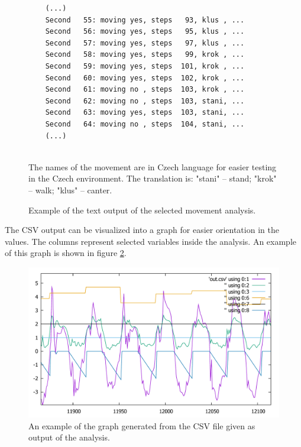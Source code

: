 \begin{figure}
    \centering
    \label{fig:textOutputAnalysis}
    \caption{Example of the text output of the selected movement analysis.}
    \begin{verbatim}
    (...)
    Second   55: moving yes, steps   93, klus , ...
    Second   56: moving yes, steps   95, klus , ...
    Second   57: moving yes, steps   97, klus , ...
    Second   58: moving yes, steps   99, krok , ...
    Second   59: moving yes, steps  101, krok , ...
    Second   60: moving yes, steps  102, krok , ...
    Second   61: moving no , steps  103, krok , ...
    Second   62: moving no , steps  103, stani, ...
    Second   63: moving yes, steps  103, stani, ...
    Second   64: moving no , steps  104, stani, ...
    (...)
    \end{verbatim}
    \quad\\The names of the movement are in Czech language for easier testing in the Czech environment. The translation is: "stani" -- stand; "krok" -- walk; "klus" -- canter.
\end{figure}

The \ac{CSV} output can be visualized into a graph for easier orientation in the values. The columns represent selected variables inside the analysis. An example of this graph is shown in figure \ref{fig:graphSelectedAnalysis}.

\begin{figure}
    \centering
    \label{fig:graphSelectedAnalysis}
    \caption{An example of the graph generated from the \ac{CSV} file given as output of the analysis.}
    \includegraphics[width=\linewidth]{img/outputHorseAnalysisZoom.pdf}
\end{figure}

